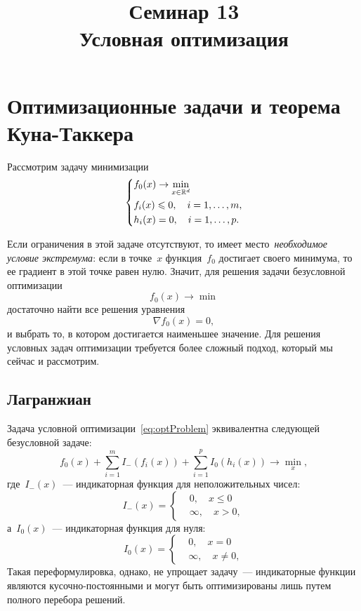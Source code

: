 \documentclass[12pt,fleqn]{article}
\begin{document}
\title{Семинар 13\\Условная оптимизация}
\author{}
\maketitle

\section{Оптимизационные задачи и теорема Куна-Таккера}

Рассмотрим задачу минимизации
\begin{equation}
\label{eq:optProblem}
    \left\{
        \begin{aligned}
            & f_0(x) \to \min_{x \in \mathbb{R}^d} \\
            & f_i(x) \leqslant 0, \quad i = 1, \dots, m, \\
            & h_i(x) = 0, \quad i = 1, \dots, p.
        \end{aligned}
    \right.
\end{equation}

Если ограничения в этой задаче отсутствуют,
то имеет место~\emph{необходимое условие экстремума}:
если в точке~$x$ функция~$f_0$ достигает своего минимума,
то ее градиент в этой точке равен нулю.
Значит, для решения задачи безусловной оптимизации
\[
    f_0(x) \to \min
\]
достаточно найти все решения уравнения
\[
    \nabla f_0(x) = 0,
\]
и выбрать то, в котором достигается наименьшее значение.
Для решения условных задач оптимизации требуется более сложный подход,
который мы сейчас и рассмотрим.

\subsection{Лагранжиан}
Задача условной оптимизации~\eqref{eq:optProblem} эквивалентна
следующей безусловной задаче:
\[
    f_0(x)
    +
    \sum_{i = 1}^{m} I_{-}(f_i(x))
    +
    \sum_{i = 1}^{p} I_{0}(h_i(x))
    \to
    \min_{x},
\]
где~$I_{-}(x)$~--- индикаторная функция для неположительных чисел:
\[
    I_{-}(x)
    =
    \left\{
        \begin{aligned}
            &0, \quad x \leq 0 \\
            &\infty, \quad x > 0,
        \end{aligned}
    \right.
\]
а~$I_{0}(x)$~--- индикаторная функция для нуля:
\[
    I_{0}(x)
    =
    \left\{
        \begin{aligned}
            &0, \quad x = 0 \\
            &\infty, \quad x \neq 0,
        \end{aligned}
    \right.
\]
Такая переформулировка, однако, не упрощает задачу~--- индикаторные
функции являются кусочно-постоянными и могут быть оптимизированы
лишь путем полного перебора решений.
\end{document}
